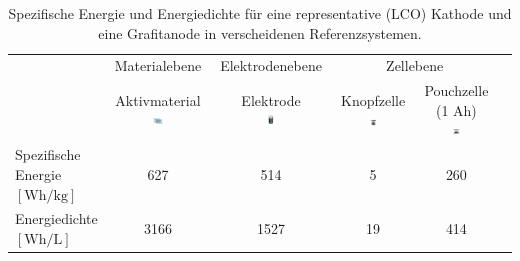 \begin{table}[ht]
    \centering
    \caption{\label{tab:energy_densities}Spezifische Energie und Energiedichte für eine representative  (LCO) Kathode und eine Grafitanode in verscheidenen Referenzsystemen.\cite{Son2021}}
    \begin{tabular}[t]{lccccc}
    \toprule
    \multirow{2}{*}{}
    &\multirow{1}{*}{Materialebene} %
    &\multirow{1}{*}{Elektrodenebene}
    &\multicolumn{2}{c}{Zellebene}
    \\ \cmidrule{2-5}
    &\makecell{Aktivmaterial\\\includegraphics[width=0.125\textwidth]{CathodeMaterials/LiC6.png}\vspace{-1em}}
    &\makecell{Elektrode\\\includegraphics[width=0.1\textwidth]{EnergyDensitiesScales/Electrode.png}\vspace{-1em}}
    &\makecell{Knopfzelle\\\includegraphics[width=0.1\textwidth]{EnergyDensitiesScales/CoinCell.png}\vspace{-1em}}
    &\makecell{Pouchzelle\\(1 Ah)\\\includegraphics[width=0.1\textwidth]{EnergyDensitiesScales/PouchCell.png}\vspace{-1em}}
    \\
    \midrule
    \makecell{Spezifische Energie\\ $\left[ \si{\watt \hour \per \kg} \right]$} & 627 & 514 & 5 & 260\\
    \makecell{Energiedichte\\ $\left[ \si{\watt \hour \per \liter} \right]$} & 3166 & 1527 & 19 & 414\\
    \bottomrule
    \end{tabular}
\end{table}%